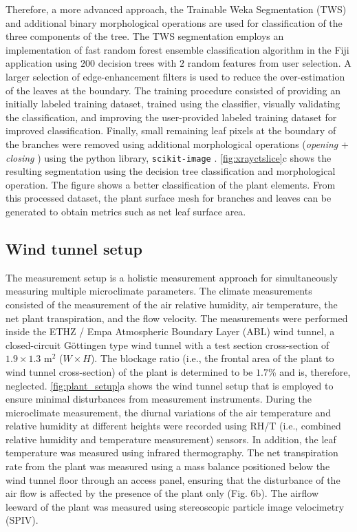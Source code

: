 Therefore, a more advanced approach, the Trainable Weka Segmentation (TWS) \citep{Arganda-Carreras2017} and additional binary morphological operations are used for classification of the three components of the tree. The TWS segmentation employs an implementation of fast random forest ensemble classification algorithm in the Fiji application \citep{Schindelin2012a} using $200$ decision trees with $2$ random features from user selection. A larger selection of edge-enhancement filters is used to reduce the over-estimation of the leaves at the boundary. The training procedure consisted of providing an initially labeled training dataset, trained using the classifier, visually validating the classification, and improving the user-provided labeled training dataset for improved classification. Finally, small remaining leaf pixels at the boundary of the branches were removed using additional morphological operations (\textit{opening} + \textit{closing} \citep{Haralick1987}) using the python library, \texttt{scikit-image} \citep{VanderWalt2014a}. \cref{fig:xrayctslice}c shows the resulting segmentation using the decision tree classification and morphological operation. The figure shows a better classification of the plant elements. From this processed dataset, the plant surface mesh  for branches and leaves can be generated to obtain metrics such as net leaf surface area.


\subsection{Wind tunnel setup}
\label{subsec:windtunnelsetup}

The measurement setup is a holistic measurement approach for simultaneously measuring multiple microclimate parameters. The climate measurements consisted of the measurement of the air relative humidity, air temperature, the net plant transpiration, and the flow velocity. The measurements were performed inside the ETHZ / Empa Atmospheric Boundary Layer (ABL) wind tunnel, a closed-circuit G\"ottingen type wind tunnel with a test section cross-section of $1.9\times1.3$ m$^2$ ($W\times H$). The blockage ratio (i.e., the frontal area of the plant to wind tunnel cross-section) of the plant is determined to be $1.7$\% and is, therefore, neglected. \cref{fig:plant_setup}a shows the wind tunnel setup that is employed to ensure minimal disturbances from measurement instruments. During the microclimate measurement, the diurnal variations of the air temperature and relative humidity at different heights were recorded using RH/T (i.e., combined relative humidity and temperature measurement) sensors. In addition, the leaf temperature was measured using infrared thermography. The net transpiration rate from the plant was measured using a mass balance positioned below the wind tunnel floor through an access panel, ensuring that the disturbance of the air flow is affected by the presence of the plant only (Fig. 6b). The airflow leeward of the plant was measured using stereoscopic particle image velocimetry (SPIV). 

